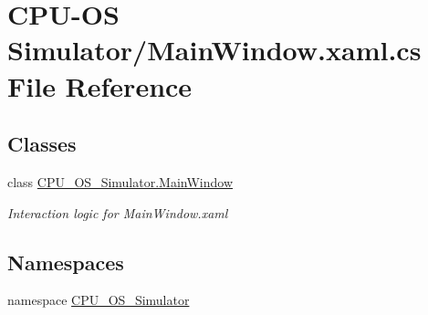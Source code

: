 \hypertarget{_c_p_u-_o_s_01_simulator_2_main_window_8xaml_8cs}{}\section{C\+P\+U-\/\+O\+S Simulator/\+Main\+Window.xaml.\+cs File Reference}
\label{_c_p_u-_o_s_01_simulator_2_main_window_8xaml_8cs}
\subsection*{Classes}
\begin{DoxyCompactItemize}
\item 
class \hyperlink{class_c_p_u___o_s___simulator_1_1_main_window}{C\+P\+U\+\_\+\+O\+S\+\_\+\+Simulator.\+Main\+Window}
\begin{DoxyCompactList}\small\item\em Interaction logic for Main\+Window.\+xaml \end{DoxyCompactList}\end{DoxyCompactItemize}
\subsection*{Namespaces}
\begin{DoxyCompactItemize}
\item 
namespace \hyperlink{namespace_c_p_u___o_s___simulator}{C\+P\+U\+\_\+\+O\+S\+\_\+\+Simulator}
\end{DoxyCompactItemize}
